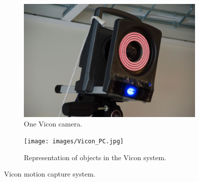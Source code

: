 \begin{figure}[h]
	\centering
	\begin{subfigure}[t]{0.49\textwidth}
		\centering
		\includegraphics[scale = 0.25]{images/Vicon_camera.jpg}
		\caption{One Vicon camera.}
		\label{subfig:vicon1}
	\end{subfigure} 
	\begin{subfigure}[t]{0.49\textwidth}
		\centering
		\texttt{[image: images/Vicon\_PC.jpg]}
		\caption{Representation of objects in the Vicon system.}
		\label{subfig:vicon2}
	\end{subfigure}
	\caption{Vicon motion capture system.}
	\label{fig:vicon}
\end{figure} 

